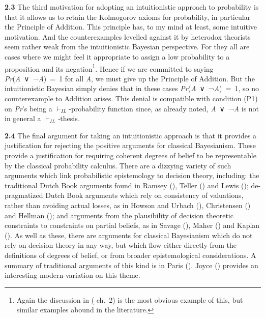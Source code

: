 \documentclass[
  11pt,
  letterpaper,
  DIV=11,
  numbers=noendperiod,
  twoside]{scrartcl}
\begin{document}
\textbf{2.3} The third motivation for adopting an intuitionistic
approach to probability is that it allows us to retain the Kolmogorov
axioms for probability, in particular the Principle of Addition. This
principle has, to my mind at least, some intuitive motivation. And the
counterexamples levelled against it by heterodox theorists seem rather
weak from the intuitionistic Bayesian perspective. For they all are
cases where we might feel it appropriate to assign a low probability to
a proposition and its negation\footnote{Again the discussion in
  ( ch.~2) is the most obvious
  example of this, but similar examples abound in the literature.}.
Hence if we are committed to saying \emph{Pr}(\emph{A}~∨~¬\emph{A})~=~1
for all \emph{A}, we must give up the Principle of Addition. But the
intuitionistic Bayesian simply denies that in these cases
\emph{Pr}(\emph{A}~∨~¬\emph{A})~=~1, so no counterexample to Addition
arises. This denial is compatible with condition (P1) on \emph{Pr}'s
being a \(\vdash_{IL}\)-probability function since, as already noted,
\emph{A}~∨~¬\emph{A} is not in general a
\(\vdash_{IL}\)\emph{-}thesis\emph{.}

\textbf{2.4} The final argument for taking an intuitionistic approach is
that it provides a justification for rejecting the positive arguments
for classical Bayesianism. These provide a justification for requiring
coherent degrees of belief to be representable by the classical
probability calculus. There are a dizzying variety of such arguments
which link probabilistic epistemology to decision theory, including: the
traditional Dutch Book arguments found in Ramsey
(), Teller
() and Lewis
(); de-pragmatized Dutch Book arguments
which rely on consistency of valuations, rather than avoiding actual
losses, as in Howson and Urbach (),
Christensen () and Hellman
(); and arguments from the plausibility
of decision theoretic constraints to constraints on partial beliefs, as
in Savage (), Maher
() and Kaplan
(). As well as these, there are arguments
for classical Bayesianism which do not rely on decision theory in any
way, but which flow either directly from the definitions of degrees of
belief, or from broader epistemological considerations. A summary of
traditional arguments of this kind is in Paris
(). Joyce ()
provides an interesting modern variation on this theme.
\end{document}
